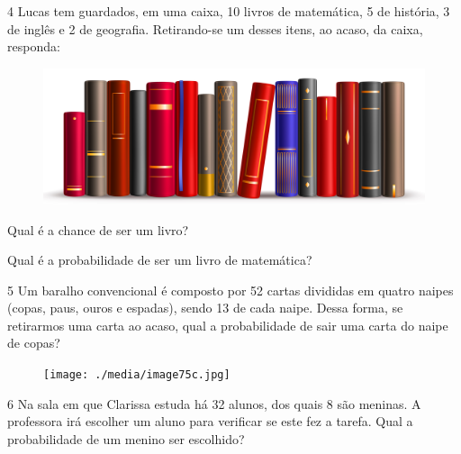 
\num{4} Lucas tem guardados, em uma caixa, 10 livros de matemática, 5 de história, 3 de inglês e
2 de geografia. Retirando-se um desses itens, ao acaso, da caixa,
responda:

\begin{figure}[htpb!]
\centering
\includegraphics[width=.5\textwidth]{./media/image75b.jpg}
\end{figure}\enlargethispage{\baselineskip}

\begin{escolha}
\item Qual é a chance de ser um livro?\\

\item  Qual é a probabilidade de ser um livro de matemática?\\
\end{escolha}

\num{5} Um baralho convencional é composto por 52 cartas divididas em quatro
naipes (copas, paus, ouros e espadas), sendo 13 de cada naipe. Dessa
forma, se retirarmos uma carta ao acaso, qual a probabilidade de sair
uma carta do naipe de copas?

\begin{figure}[htpb!]
\centering
\texttt{[image: ./media/image75c.jpg]}
\end{figure}


\num{6} Na sala em que Clarissa estuda há 32 alunos, dos quais 8 são meninas. A
professora irá escolher um aluno para verificar se este fez a tarefa.
Qual a probabilidade de um menino ser escolhido?


